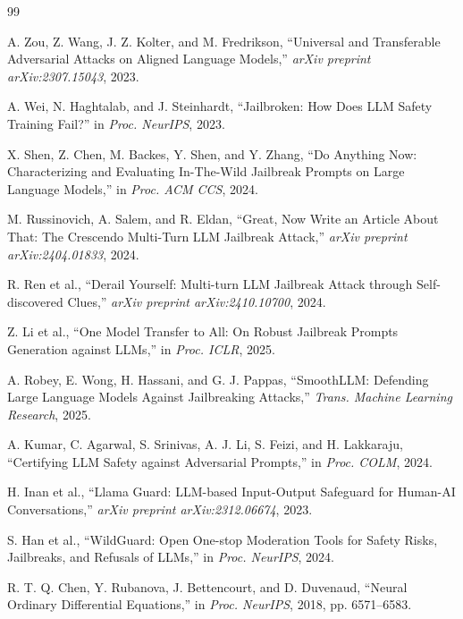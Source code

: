 \documentclass[journal]{IEEEtran}
\theoremstyle{plain}
\theoremstyle{definition}
\theoremstyle{remark}
\begin{document}
\begin{thebibliography}{99}

A. Zou, Z. Wang, J. Z. Kolter, and M. Fredrikson, ``Universal and Transferable Adversarial Attacks on Aligned Language Models,'' \textit{arXiv preprint arXiv:2307.15043}, 2023.

A. Wei, N. Haghtalab, and J. Steinhardt, ``Jailbroken: How Does LLM Safety Training Fail?'' in \textit{Proc. NeurIPS}, 2023.

X. Shen, Z. Chen, M. Backes, Y. Shen, and Y. Zhang, ``Do Anything Now: Characterizing and Evaluating In-The-Wild Jailbreak Prompts on Large Language Models,'' in \textit{Proc. ACM CCS}, 2024.

M. Russinovich, A. Salem, and R. Eldan, ``Great, Now Write an Article About That: The Crescendo Multi-Turn LLM Jailbreak Attack,'' \textit{arXiv preprint arXiv:2404.01833}, 2024.

R. Ren et al., ``Derail Yourself: Multi-turn LLM Jailbreak Attack through Self-discovered Clues,'' \textit{arXiv preprint arXiv:2410.10700}, 2024.

Z. Li et al., ``One Model Transfer to All: On Robust Jailbreak Prompts Generation against LLMs,'' in \textit{Proc. ICLR}, 2025.

A. Robey, E. Wong, H. Hassani, and G. J. Pappas, ``SmoothLLM: Defending Large Language Models Against Jailbreaking Attacks,'' \textit{Trans. Machine Learning Research}, 2025.

A. Kumar, C. Agarwal, S. Srinivas, A. J. Li, S. Feizi, and H. Lakkaraju, ``Certifying LLM Safety against Adversarial Prompts,'' in \textit{Proc. COLM}, 2024.

H. Inan et al., ``Llama Guard: LLM-based Input-Output Safeguard for Human-AI Conversations,'' \textit{arXiv preprint arXiv:2312.06674}, 2023.

S. Han et al., ``WildGuard: Open One-stop Moderation Tools for Safety Risks, Jailbreaks, and Refusals of LLMs,'' in \textit{Proc. NeurIPS}, 2024.

R. T. Q. Chen, Y. Rubanova, J. Bettencourt, and D. Duvenaud, ``Neural Ordinary Differential Equations,'' in \textit{Proc. NeurIPS}, 2018, pp. 6571--6583.


\end{thebibliography}
\end{document}
